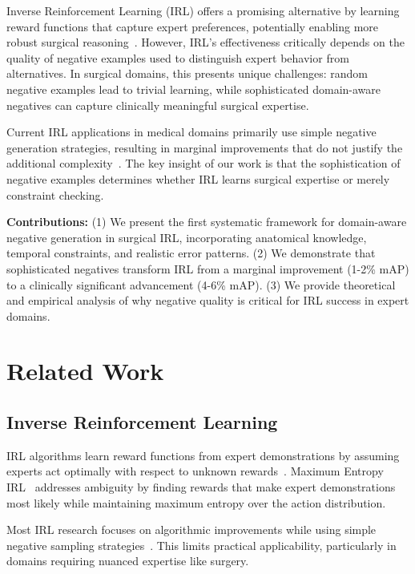 \documentclass[runningheads]{llncs}
\begin{document}
Inverse Reinforcement Learning (IRL) offers a promising alternative by learning reward functions that capture expert preferences, potentially enabling more robust surgical reasoning~\cite{ng2000algorithms}. However, IRL's effectiveness critically depends on the quality of negative examples used to distinguish expert behavior from alternatives. In surgical domains, this presents unique challenges: random negative examples lead to trivial learning, while sophisticated domain-aware negatives can capture clinically meaningful surgical expertise.

Current IRL applications in medical domains primarily use simple negative generation strategies, resulting in marginal improvements that do not justify the additional complexity~\cite{author2022medical}. The key insight of our work is that the sophistication of negative examples determines whether IRL learns surgical expertise or merely constraint checking.

\textbf{Contributions:} (1) We present the first systematic framework for domain-aware negative generation in surgical IRL, incorporating anatomical knowledge, temporal constraints, and realistic error patterns. (2) We demonstrate that sophisticated negatives transform IRL from a marginal improvement (1-2\% mAP) to a clinically significant advancement (4-6\% mAP). (3) We provide theoretical and empirical analysis of why negative quality is critical for IRL success in expert domains.

\section{Related Work}

\subsection{Inverse Reinforcement Learning}
IRL algorithms learn reward functions from expert demonstrations by assuming experts act optimally with respect to unknown rewards~\cite{abbeel2004apprenticeship}. Maximum Entropy IRL~\cite{ziebart2008maximum} addresses ambiguity by finding rewards that make expert demonstrations most likely while maintaining maximum entropy over the action distribution.

Most IRL research focuses on algorithmic improvements while using simple negative sampling strategies~\cite{fu2017learning}. This limits practical applicability, particularly in domains requiring nuanced expertise like surgery.
\end{document}
